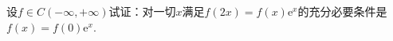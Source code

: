 \begin{xiti}
\begin{enumerate}
	\end{enumerate}
%		
%		
\item 设$f \in C ( - \infty , + \infty )$试证：对一切$x$满足$f(2x)=f(x)\mathrm{e}^{x}$的充分必要条件是$f(x)=f(0)\mathrm{e}^{x}$.
%	
%	
%
%	

\end{xiti}
